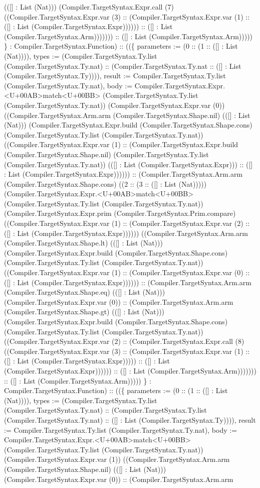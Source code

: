 \documentclass[11pt]{article}
\begin{document}
(([] : List (Nat))) (Compiler.TargetSyntax.Expr.call (7) ((Compiler.TargetSyntax.Expr.var (3) :: (Compiler.TargetSyntax.Expr.var (1) :: ([] : List (Compiler.TargetSyntax.Expr)))))) :: ([] : List (Compiler.TargetSyntax.Arm))))))) :: ([] : List (Compiler.TargetSyntax.Arm))))) \} : Compiler.TargetSyntax.Function) :: ((\{ parameters := (0 :: (1 :: ([] : List (Nat)))), types := (Compiler.TargetSyntax.Ty.list (Compiler.TargetSyntax.Ty.nat) :: (Compiler.TargetSyntax.Ty.nat :: ([] : List (Compiler.TargetSyntax.Ty)))), result := Compiler.TargetSyntax.Ty.list (Compiler.TargetSyntax.Ty.nat), body := Compiler.TargetSyntax.Expr.<U+00AB>match<U+00BB> (Compiler.TargetSyntax.Ty.list (Compiler.TargetSyntax.Ty.nat)) (Compiler.TargetSyntax.Expr.var (0)) ((Compiler.TargetSyntax.Arm.arm (Compiler.TargetSyntax.Shape.nil) (([] : List (Nat))) (Compiler.TargetSyntax.Expr.build (Compiler.TargetSyntax.Shape.cons) (Compiler.TargetSyntax.Ty.list (Compiler.TargetSyntax.Ty.nat)) ((Compiler.TargetSyntax.Expr.var (1) :: (Compiler.TargetSyntax.Expr.build (Compiler.TargetSyntax.Shape.nil) (Compiler.TargetSyntax.Ty.list (Compiler.TargetSyntax.Ty.nat)) (([] : List (Compiler.TargetSyntax.Expr))) :: ([] : List (Compiler.TargetSyntax.Expr)))))) :: (Compiler.TargetSyntax.Arm.arm (Compiler.TargetSyntax.Shape.cons) ((2 :: (3 :: ([] : List (Nat))))) (Compiler.TargetSyntax.Expr.<U+00AB>match<U+00BB> (Compiler.TargetSyntax.Ty.list (Compiler.TargetSyntax.Ty.nat)) (Compiler.TargetSyntax.Expr.prim (Compiler.TargetSyntax.Prim.compare) ((Compiler.TargetSyntax.Expr.var (1) :: (Compiler.TargetSyntax.Expr.var (2) :: ([] : List (Compiler.TargetSyntax.Expr)))))) ((Compiler.TargetSyntax.Arm.arm (Compiler.TargetSyntax.Shape.lt) (([] : List (Nat))) (Compiler.TargetSyntax.Expr.build (Compiler.TargetSyntax.Shape.cons) (Compiler.TargetSyntax.Ty.list (Compiler.TargetSyntax.Ty.nat)) ((Compiler.TargetSyntax.Expr.var (1) :: (Compiler.TargetSyntax.Expr.var (0) :: ([] : List (Compiler.TargetSyntax.Expr)))))) :: (Compiler.TargetSyntax.Arm.arm (Compiler.TargetSyntax.Shape.eq) (([] : List (Nat))) (Compiler.TargetSyntax.Expr.var (0)) :: (Compiler.TargetSyntax.Arm.arm (Compiler.TargetSyntax.Shape.gt) (([] : List (Nat))) (Compiler.TargetSyntax.Expr.build (Compiler.TargetSyntax.Shape.cons) (Compiler.TargetSyntax.Ty.list (Compiler.TargetSyntax.Ty.nat)) ((Compiler.TargetSyntax.Expr.var (2) :: (Compiler.TargetSyntax.Expr.call (8) ((Compiler.TargetSyntax.Expr.var (3) :: (Compiler.TargetSyntax.Expr.var (1) :: ([] : List (Compiler.TargetSyntax.Expr))))) :: ([] : List (Compiler.TargetSyntax.Expr)))))) :: ([] : List (Compiler.TargetSyntax.Arm))))))) :: ([] : List (Compiler.TargetSyntax.Arm))))) \} : Compiler.TargetSyntax.Function) :: ((\{ parameters := (0 :: (1 :: ([] : List (Nat)))), types := (Compiler.TargetSyntax.Ty.list (Compiler.TargetSyntax.Ty.nat) :: (Compiler.TargetSyntax.Ty.list (Compiler.TargetSyntax.Ty.nat) :: ([] : List (Compiler.TargetSyntax.Ty)))), result := Compiler.TargetSyntax.Ty.list (Compiler.TargetSyntax.Ty.nat), body := Compiler.TargetSyntax.Expr.<U+00AB>match<U+00BB> (Compiler.TargetSyntax.Ty.list (Compiler.TargetSyntax.Ty.nat)) (Compiler.TargetSyntax.Expr.var (1)) ((Compiler.TargetSyntax.Arm.arm (Compiler.TargetSyntax.Shape.nil) (([] : List (Nat))) (Compiler.TargetSyntax.Expr.var (0)) :: (Compiler.TargetSyntax.Arm.arm 
\end{document}
